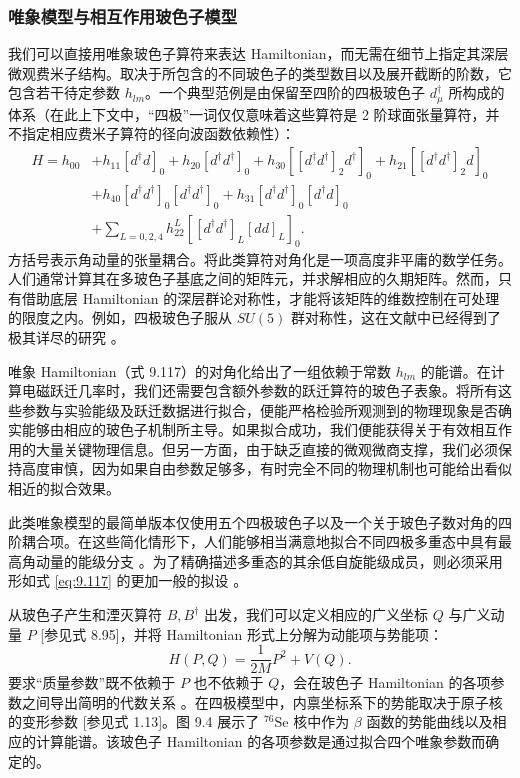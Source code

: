 \subsubsection{唯象模型与相互作用玻色子模型\label{subsubsec:9.2.8.1_=00552F=008C61=006A21=00578B=004E0E=0076F8=004E92=004F5C=007528=0073BB=008272=005B50=006A21=00578B}}

我们可以直接用唯象玻色子算符来表达 Hamiltonian，而无需在细节上指定其深层微观费米子结构。取决于所包含的不同玻色子的类型数目以及展开截断的阶数，它包含若干待定参数
$h_{lm}$。一个典型范例是由保留至四阶的四极玻色子 $d^{\dagger}_{\mu}$ 所构成的体系（在此上下文中，“四极”一词仅仅意味着这些算符是
2 阶球面张量算符，并不指定相应费米子算符的径向波函数依赖性）：
\begin{align}
H=h_{00} & +h_{11}[d^{\dagger}d]_{0}+h_{20}[d^{\dagger}d^{\dagger}]_{0}+h_{30}[[d^{\dagger}d^{\dagger}]_{2}d^{\dagger}]_{0}+h_{21}[[d^{\dagger}d^{\dagger}]_{2}d]_{0}\nonumber \\
 & +h_{40}[d^{\dagger}d^{\dagger}]_{0}[d^{\dagger}d^{\dagger}]_{0}+h_{31}[d^{\dagger}d^{\dagger}]_{0}[d^{\dagger}d]_{0}\nonumber \\
 & +\sum_{L=0,2,4}h^{L}_{22}[[d^{\dagger}d^{\dagger}]_{L}[dd]_{L}]_{0}.\label{eq:9.117}
\end{align}
方括号表示角动量的张量耦合。将此类算符对角化是一项高度非平庸的数学任务。人们通常计算其在多玻色子基底之间的矩阵元，并求解相应的久期矩阵。然而，只有借助底层
Hamiltonian 的深层群论对称性，才能将该矩阵的维数控制在可处理的限度之内。例如，四极玻色子服从 $SU(5)$ 群对称性，这在文献中已经得到了极其详尽的研究
\cite{WHG66,KPW68,WP68,KT71}。

唯象 Hamiltonian（式 9.117）的对角化给出了一组依赖于常数 $h_{lm}$ 的能谱。在计算电磁跃迁几率时，我们还需要包含额外参数的跃迁算符的玻色子表象。将所有这些参数与实验能级及跃迁数据进行拟合，便能严格检验所观测到的物理现象是否确实能够由相应的玻色子机制所主导。如果拟合成功，我们便能获得关于有效相互作用的大量关键物理信息。但另一方面，由于缺乏直接的微观微商支撑，我们必须保持高度审慎，因为如果自由参数足够多，有时完全不同的物理机制也可能给出看似相近的拟合效果。

此类唯象模型的最简单版本仅使用五个四极玻色子以及一个关于玻色子数对角的四阶耦合项。在这些简化情形下，人们能够相当满意地拟合不同四极多重态中具有最高角动量的能级分支
\cite{BTK65,DDK70,HR74,IA74}。为了精确描述多重态的其余低自旋能级成员，则必须采用形如式 \ref{eq:9.117}
的更加一般的拟设 \cite{KS62,GG71,HL72a}。

从玻色子产生和湮灭算符 $B,B^{\dagger}$ 出发，我们可以定义相应的广义坐标 $Q$ 与广义动量 $P$ {[}参见式
8.95{]}，并将 Hamiltonian 形式上分解为动能项与势能项：
\begin{equation}
H(P,Q)=\frac{1}{2M}P^{2}+V(Q).\label{eq:9.118}
\end{equation}
要求“质量参数”既不依赖于 $P$ 也不依赖于 $Q$，会在玻色子 Hamiltonian 的各项参数之间导出简明的代数关系 \cite{Ho71a}。在四极模型中，内禀坐标系下的势能取决于原子核的变形参数
{[}参见式 1.13{]}。图 9.4 展示了 $^{76}\text{Se}$ 核中作为 $\beta$ 函数的势能曲线以及相应的计算能谱。该玻色子
Hamiltonian 的各项参数是通过拟合四个唯象参数而确定的。

